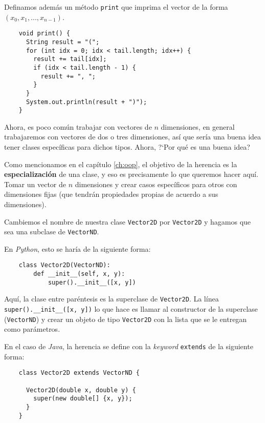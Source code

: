   Definamos además un método \texttt{print} que imprima el vector de la forma \((x_0, x_1, 
  ..., x_{n - 1})\).

  
  \begin{verbatim}
    void print() {
      String result = "(";
      for (int idx = 0; idx < tail.length; idx++) {
        result += tail[idx];
        if (idx < tail.length - 1) {
          result += ", ";
        }
      }
      System.out.println(result + ")");
    }
  \end{verbatim}
  
  Ahora, es poco común trabajar con vectores de \(n\) dimensiones, en general trabajaremos
  con vectores de dos o tres dimensiones, así que sería una buena idea tener clases 
  específicas para dichos tipos.
  Ahora, ?`Por qué es una buena idea?

  Como mencionamos en el capítulo \ref{ch:oop}, el objetivo de la herencia es la 
  \textbf{especialización} de una clase, y eso es precisamente lo que queremos hacer aquí.
  Tomar un vector de \(n\) dimensiones y crear casos específicos para otros con 
  dimensiones fijas (que tendrán propiedades propias de acuerdo a sus dimensiones).

  Cambiemos el nombre de nuestra clase \texttt{Vector2D} por \texttt{Vector2D} y hagamos
  que sea una subclase de \texttt{VectorND}.

  En \textit{Python}, esto se haría de la siguiente forma:

  \begin{verbatim}
    class Vector2D(VectorND):
        def __init__(self, x, y):
            super().__init__([x, y])
  \end{verbatim}

  Aquí, la clase entre paréntesis es la superclase de \texttt{Vector2D}.
  La línea \texttt{super().__init__([x, y])} lo que hace es llamar al 
  constructor de la superclase (\texttt{VectorND}) y crear un objeto de tipo 
  \texttt{Vector2D} con la lista que se le entregan como parámetros.

  En el caso de \textit{Java}, la herencia se define con la \textit{keyword} 
  \texttt{extends} de la siguiente forma:

  \begin{verbatim}
    class Vector2D extends VectorND {

      Vector2D(double x, double y) {
        super(new double[] {x, y});
      }
    }
  \end{verbatim}

